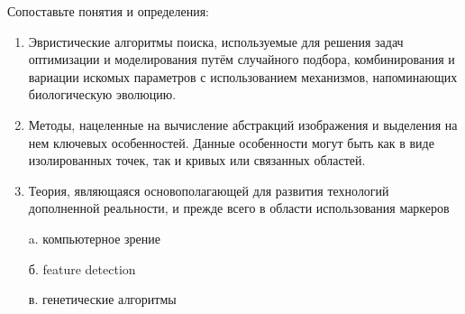 
Сопоставьте понятия и определения:

\begin{enumerate}
    \item Эвристические алгоритмы поиска, используемые для решения задач оптимизации и моделирования путём случайного подбора, комбинирования и вариации искомых параметров с использованием механизмов, напоминающих биологическую эволюцию.
    \item Методы, нацеленные на вычисление абстракций изображения и выделения на нем ключевых особенностей. Данные особенности могут быть как в виде изолированных точек, так и кривых или связанных областей.
    \item Теория, являющаяся основополагающей для развития технологий дополненной реальности, и прежде всего в области использования маркеров
\end{enumerate}

\begin{enumerate}
    \item[a.] компьютерное зрение
    \item[б.] feature detection
    \item[в.] генетические алгоритмы
\end{enumerate}

